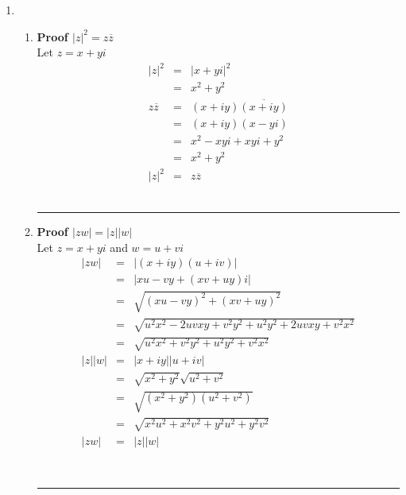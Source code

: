 \documentclass{article}%
\newcommand\abs[1]{\left|#1\right|}
\newenvironment{proof}[1][]{\textbf{Proof #1} }{\ \rule{0.5em}{0.5em}}
\begin{document}
\begin{enumerate}
\begin{enumerate}[label*=\arabic*.]
\begin{enumerate}[label=\alph*]
        \end{enumerate}
        \item
        \begin{enumerate}[label=\alph*]
            \item
            \begin{proof}[$\abs{z}^2=z\overline{z}$]
                \\ Let $z=x+yi$
                \begin{eqnarray*}
                    \abs{z}^2&=&\abs{x+yi}^2 \\
                             &=&x^2+y^2 \\
                    z\overline{z}&=&(x+iy)\overline{(x+iy)} \\
                                 &=&(x+iy)(x-yi) \\
                                 &=&x^2-xyi+xyi+y^2 \\
                                 &=&x^2+y^2 \\
                    \abs{z}^2&=&z\overline{z}
                \end{eqnarray*}
            \end{proof}
            \item
            \begin{proof}[$\abs{zw}=\abs{z}\abs{w}$]
                \\ Let $z=x+yi$ and $w=u+vi$
                \begin{eqnarray*}
                    \abs{zw}&=&\abs{(x+iy)(u+iv)} \\
                            &=&\abs{xu-vy+(xv+uy)i} \\
                            &=&\sqrt{(xu-vy)^2+(xv+uy)^2} \\
                            &=&\sqrt{u^2x^2-2uvxy+v^2y^2+u^2y^2+2uvxy+v^2x^2} \\
                            &=&\sqrt{u^2x^2+v^2y^2+u^2y^2+v^2x^2} \\
                    \abs{z}\abs{w}&=&\abs{x+iy}\abs{u+iv} \\
                                  &=&\sqrt{x^2+y^2}\sqrt{u^2+v^2} \\
                                  &=&\sqrt{(x^2+y^2)(u^2+v^2)} \\
                                  &=&\sqrt{x^2u^2+x^2v^2+y^2u^2+y^2v^2} \\
                    \abs{zw}&=&\abs{z}\abs{w}
                \end{eqnarray*}

\end{proof}
\end{enumerate}
\end{enumerate}
\end{enumerate}
\end{document}
